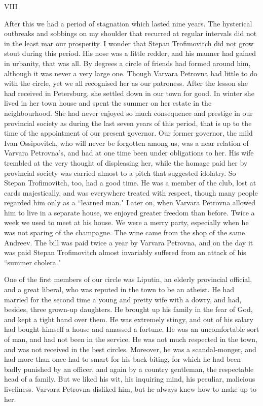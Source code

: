 \documentclass[12pt]{article}
\begin{document}
\vspace{12pt}
VIII


\vspace{12pt}
After this we had a period of stagnation which lasted nine years.
The hysterical outbreaks and sobbings on my shoulder that recurred at
regular intervals did not in the least mar our prosperity. I wonder that
Stepan Trofimovitch did not grow stout during this period. His nose was
a little redder, and his manner had gained in urbanity, that was all. By
degrees a circle of friends had formed around him, although it was never
a very large one. Though Varvara Petrovna had little to do with the
circle, yet we all recognised her as our patroness. After the lesson she
had received in Petersburg, she settled down in our town for good. In
winter she lived in her town house and spent the summer on her estate
in the neighbourhood. She had never enjoyed so much consequence and
prestige in our provincial society as during the last seven years of
this period, that is up to the time of the appointment of our present
governor. Our former governor, the mild Ivan Ossipovitch, who will never
be forgotten among us, was a near relation of Varvara Petrovna's, and
had at one time been under obligations to her. His wife trembled at the
very thought of displeasing her, while the homage paid her by provincial
society was carried almost to a pitch that suggested idolatry. So Stepan
Trofimovitch, too, had a good time. He was a member of the club, lost at
cards majestically, and was everywhere treated with respect, though
many people regarded him only as a ``learned man." Later on, when Varvara
Petrovna allowed him to live in a separate house, we enjoyed greater
freedom than before. Twice a week we used to meet at his house. We were
a merry party, especially when he was not sparing of the champagne. The
wine came from the shop of the same Andreev. The bill was paid twice
a year by Varvara Petrovna, and on the day it was paid Stepan
Trofimovitch almost invariably suffered from an attack of his ``summer
cholera."


\vspace{12pt}
One of the first members of our circle was Liputin, an elderly
provincial official, and a great liberal, who was reputed in the town
to be an atheist. He had married for the second time a young and pretty
wife with a dowry, and had, besides, three grown-up daughters. He
brought up his family in the fear of God, and kept a tight hand over
them. He was extremely stingy, and out of his salary had bought himself
a house and amassed a fortune. He was an uncomfortable sort of man, and
had not been in the service. He was not much respected in the town, and
was not received in the best circles. Moreover, he was a scandal-monger,
and had more than once had to smart for his back-biting, for which he
had been badly punished by an officer, and again by a country gentleman,
the respectable head of a family. But we liked his wit, his inquiring
mind, his peculiar, malicious liveliness. Varvara Petrovna disliked him,
but he always knew how to make up to her.
\end{document}
